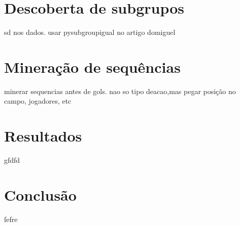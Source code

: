 \documentclass{article}
\begin{document}
\section{Descoberta de subgrupos}

sd nos dados. usar pysubgroupigual no artigo domiguel

\section{Mineração de sequências}

minerar sequencias antes de gols. nao so tipo deacao,mas pegar posição no
campo, jogadores, etc

\section{Resultados}

gfdfd

\section{Conclusão}

fefre

\newpage

\renewcommand{\refname}{Referências Bibliográficas}

\nocite{*}
\end{document}
